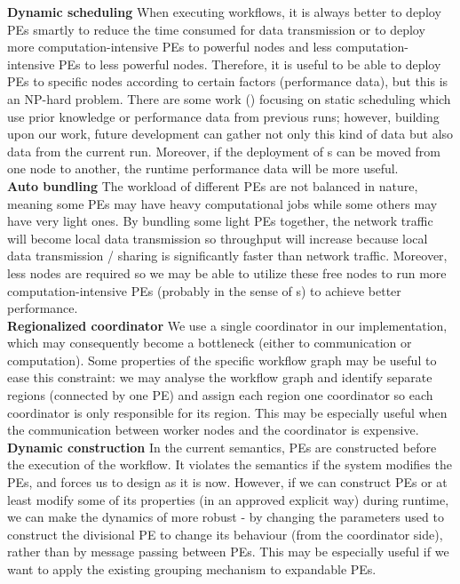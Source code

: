 \textbf{Dynamic scheduling}\quad
When executing workflows, it is always better to deploy PEs smartly to reduce the time consumed for data transmission or to deploy more computation-intensive PEs to powerful nodes and less computation-intensive PEs to less powerful nodes. Therefore, it is useful to be able to deploy PEs to specific nodes according to certain factors (\eg performance data), but this is an NP-hard problem. There are some work (\eg \cite{teylo2017hybrid}) focusing on static scheduling which use prior knowledge or performance data from previous runs; however, building upon our work, future development can gather not only this kind of data but also data from the current run. Moreover, if the deployment of \tPEInst{}s can be moved from one node to another, the runtime performance data will be more useful. \\

\textbf{Auto bundling}\quad
The workload of different PEs are not balanced in nature, meaning some PEs may have heavy computational jobs while some others may have very light ones. By bundling some light PEs together, the network traffic will become local data transmission so throughput will increase because local data transmission / sharing is significantly faster than network traffic. Moreover, less nodes are required so we may be able to utilize these free nodes to run more computation-intensive PEs (probably in the sense of \tPEDup{}s) to achieve better performance. \\

\textbf{Regionalized coordinator}\quad
We use a single coordinator in our implementation, which may consequently become a bottleneck (either to communication or computation). Some properties of the specific workflow graph may be useful to ease this constraint: we may analyse the workflow graph and identify separate regions (\eg connected by one PE) and assign each region one coordinator so each coordinator is only responsible for its region. This may be especially useful when the communication between worker nodes and the coordinator is expensive. \\

\textbf{Dynamic construction}\quad
In the current \dpy semantics, PEs are constructed before the execution of the workflow. It violates the semantics if the system modifies the PEs, and forces us to design \tdynexp as it is now. However, if we can construct PEs or at least modify some of its properties (in an approved explicit way) during runtime, we can make the dynamics of \tdynexp more robust - by changing the parameters used to construct the divisional PE to change its behaviour (from the coordinator side), rather than by message passing between PEs. This may be especially useful if we want to apply the existing grouping mechanism to expandable PEs.

